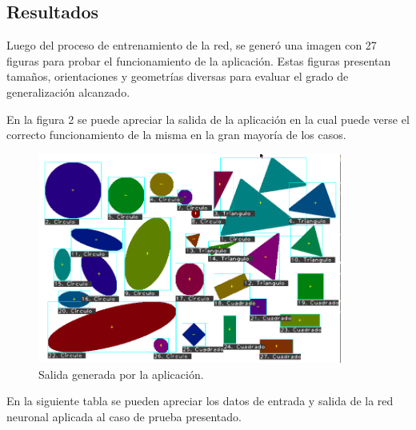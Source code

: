 \documentclass[pdftex,a4paper,12pt]{article}
\begin{document}
\subsection{Resultados} %

Luego del proceso de entrenamiento de la red, se gener\'o una imagen con 27 figuras para probar el funcionamiento de la aplicaci\'on. Estas figuras presentan tama\~nos, orientaciones y geometr\'ias diversas para evaluar el grado de generalizaci\'on alcanzado.

En la figura 2 se puede apreciar la salida de la aplicaci\'on en la cual puede verse el correcto funcionamiento de la misma en la gran mayor\'ia de los casos.

               \begin{figure}[H]
	                  \begin{center}
	                    \includegraphics[width=10cm]{salida.png}
	                    \caption{\label{image_soleil} Salida generada por la aplicaci\'on. }
	                  \end{center}
	            \end{figure}

En la siguiente tabla se pueden apreciar los datos de entrada y salida de la red neuronal aplicada al caso de prueba presentado.
\end{document}

